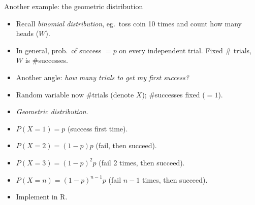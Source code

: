 \documentclass[unknownkeysallowed]{beamer}\usepackage[]{graphicx}\usepackage[]{color}
\begin{document}
\begin{frame}[fragile]{Another example: the geometric distribution}

  \begin{itemize}
  \item Recall \emph{binomial distribution}, eg.\ toss coin 10 times
    and count how many heads ($W$).
  \item In general, prob.\ of success $=p$ on every independent
    trial. Fixed \# trials, $W$ is \#successes.
  \item Another angle: \emph{how many trials to get my first success?}
  \item Random variable now \#trials (denote $X$); \#successes fixed ($=1$).
  \item \emph{Geometric distribution}.
  \item $P(X=1)=p$ (success first time).
  \item $P(X=2)=(1-p)p$ (fail, then succeed).
  \item $P(X=3)=(1-p)^2p$ (fail 2 times, then succeed).
  \item $P(X=n)=(1-p)^{n-1}p$ (fail $n-1$ times, then succeed).
  \item Implement in R.
  \end{itemize}
  
\end{frame}
\end{document}
